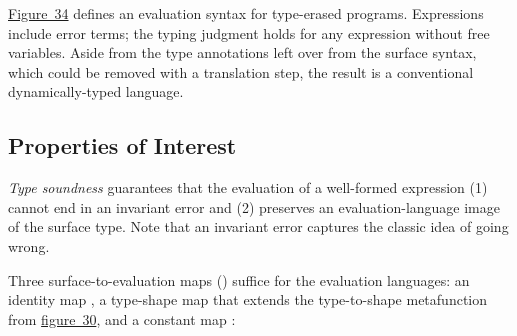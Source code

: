 \documentclass[ twoside,open=right,titlepage,numbers=noenddot,headinclude,%
                footinclude=true,cleardoublepage=empty,abstract=off,
                BCOR=5mm,paper=a4,fontsize=11pt,%
                ngerman,american,%
                parts,pdfspacing]{scrreprt}
\newcommand{\Ssubsubsection}[2]{\subsubsection[#1]{#2}}
\newcommand{\FigureRef}[2]{#1}
\renewcommand{\Ssubsubsection}[2]{\subsection[#1]{#2}}
\begin{document}
\hyperref[t:x28counter_x28x22figurex22_x22figx3aevaluationx2deox22x29x29]{Figure~\FigureRef{34}{t:x28counter_x28x22figurex22_x22figx3aevaluationx2deox22x29x29}} defines an evaluation syntax for type{-}erased
 programs.
Expressions include error terms; the typing judgment holds
 for any expression without free variables.
Aside from the type annotations left over from the surface syntax, which could be
 removed with a translation step, the result is a conventional dynamically{-}typed language.

\Ssubsubsection{Properties of Interest}{Properties of Interest}\label{t:x28part_x22secx3adesignx3atechx3apropertiesx22x29}

\label{sec:design:tech:properties}

\emph{Type soundness} guarantees that the evaluation of a well{-}formed expression
 (1) cannot end in an invariant error and (2) preserves an evaluation{-}language
 image of the surface type.
Note that an invariant error captures the classic idea of going wrong.


\noindent{}Three surface{-}to{-}evaluation maps (\relax{$\sXproj$}) suffice for the evaluation languages:
 an identity map \relax{$\sidproj$},
 a type{-}shape map \relax{$\stagproj$} that extends the type{-}to{-}shape metafunction from \hyperref[t:x28counter_x28x22figurex22_x22figx3aevaluationx2dcommonx22x29x29]{figure~\FigureRef{30}{t:x28counter_x28x22figurex22_x22figx3aevaluationx2dcommonx22x29x29}},
 and a constant map \relax{$\sdynproj$}:

\end{document}
